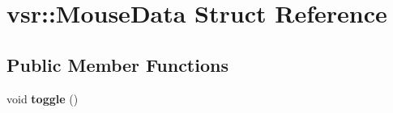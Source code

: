 \hypertarget{structvsr_1_1_mouse_data}{\section{vsr\-:\-:Mouse\-Data Struct Reference}
\label{structvsr_1_1_mouse_data}
}
\subsection*{Public Member Functions}
\begin{DoxyCompactItemize}
\item 
\hypertarget{structvsr_1_1_mouse_data_ae0e1d7abdf99e5ea6d5e7746512415e6}{void {\bfseries toggle} ()}\label{structvsr_1_1_mouse_data_ae0e1d7abdf99e5ea6d5e7746512415e6}

\end{DoxyCompactItemize}
